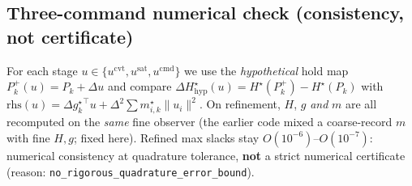 \subsection{Three-command numerical check (consistency, not certificate)}
For each stage $u\in\{u^{\mathrm{cvt}},u^{\mathrm{sat}},u^{\mathrm{cmd}}\}$ we use
the \emph{hypothetical} hold map $P_k^+(u)=P_k+\Delta u$ and compare
$\Delta H^\star_{\mathrm{hyp}}(u)=H^\star(P_k^+)-H^\star(P_k)$ with
$\mathrm{rhs}(u)=\Delta{g_k^\star}^\top u+\Delta^2\sum m_{i,k}^\star\|u_i\|^2$.
On refinement, $H$, $g$ \emph{and} $m$ are all recomputed on the \emph{same}
fine observer (the earlier code mixed a coarse-record $m$ with fine $H,g$; fixed
here). Refined max slacks stay $O(10^{-6})$--$O(10^{-7})$: numerical consistency
at quadrature tolerance, \textbf{not} a strict numerical certificate
(reason: \texttt{no\_rigorous\_quadrature\_error\_bound}).
